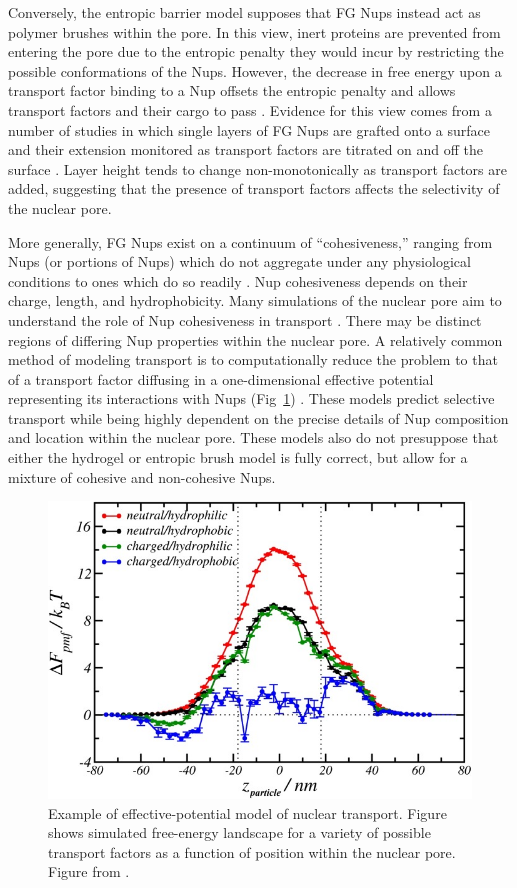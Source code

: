 Conversely, the entropic barrier model supposes that FG Nups instead act as polymer brushes within the pore.  In this view, inert proteins are prevented from entering the pore due to the entropic penalty they would incur by restricting the possible conformations of the Nups.  However, the decrease in free energy upon a transport factor binding to a Nup offsets the entropic penalty and allows transport factors and their cargo to pass \cite{rout00, lim08}.  Evidence for this view comes from a number of studies in which single layers of FG Nups are grafted onto a surface and their extension monitored as transport factors are titrated on and off the surface \cite{wagner15,zahn16,vovk16}.  Layer height tends to change non-monotonically as transport factors are added, suggesting that the presence of transport factors affects the selectivity of the nuclear pore.


More generally, FG Nups exist on a continuum of ``cohesiveness,'' ranging from Nups (or portions of Nups) which do not aggregate under any physiological conditions to ones which do so readily \cite{hough15}.  Nup cohesiveness depends on their charge, length, and hydrophobicity.  Many simulations of the nuclear pore aim to understand the role of Nup cohesiveness in transport \cite{gu19,tagliazucchi13,nasrabad16,mincer11}.  There may be distinct regions of differing Nup properties within the nuclear pore.  A relatively common method of modeling transport is to computationally reduce the problem to that of a transport factor diffusing in a one-dimensional effective potential representing its interactions with Nups (Fig~\ref{fig:effective-potential}) \cite{tagliazucchi13, zilman07,tu13, timney16}.  These models predict selective transport while being highly dependent on the precise details of Nup composition and location within the nuclear pore.  These models also do not presuppose that either the hydrogel or entropic brush model is fully correct, but allow for a mixture of cohesive and non-cohesive Nups.

\begin{figure}
\centering
\includegraphics[width=0.5\linewidth]{figs/ch01/tagliazucchi}
\caption[Effective potential model of nuclear transport.]{Example of effective-potential model of nuclear transport.  Figure shows simulated free-energy landscape for a variety of possible transport factors as a function of position within the nuclear pore. Figure from \cite{tagliazucchi13}.\\}
\label{fig:effective-potential}
\end{figure}

